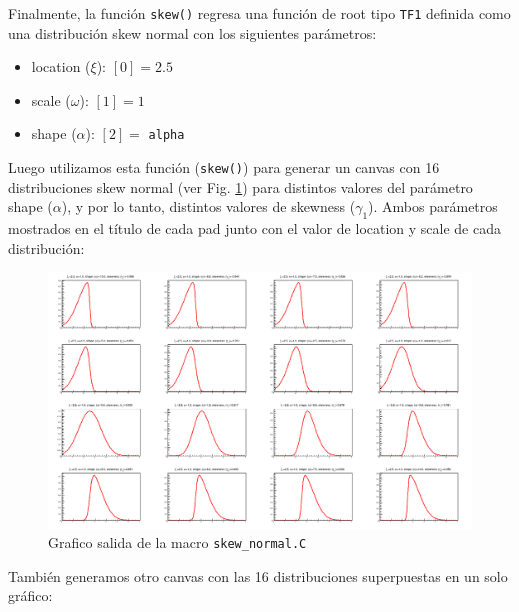 \documentclass[11pt,letterpaper]{article}
\begin{document}
Finalmente, la función \verb|skew()| regresa una función de root tipo \verb|TF1| definida como una distribución skew normal con los siguientes parámetros:

\begin{itemize}
\item location ($\xi$): $[0]=2.5$
\item scale ($\omega$): $[1]=1$
\item shape ($\alpha$): $[2]=$ \verb|alpha|
\end{itemize}

Luego utilizamos esta función (\verb|skew()|) para generar un canvas con 16 distribuciones skew normal (ver Fig. \ref{skew_normal_dist}) para distintos valores del parámetro shape ($\alpha$), y por lo tanto, distintos valores de skewness ($\gamma_1$). Ambos parámetros mostrados en el título de cada pad junto con el valor de location y scale de cada distribución:

 \begin{figure}[H]
    \includegraphics[width=1.\textwidth]{img/skew_normal_dist.png}
    \centering
     \cprotect\caption{Grafico salida de la macro \verb|skew_normal.C|} 
\label{skew_normal_dist}
\end{figure}



También generamos otro canvas con las 16 distribuciones superpuestas en un solo gráfico:
\end{document}
